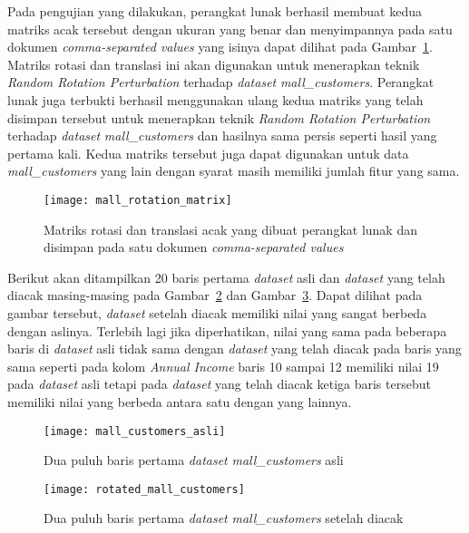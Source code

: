 Pada pengujian yang dilakukan, perangkat lunak berhasil membuat kedua matriks acak tersebut dengan ukuran yang benar dan menyimpannya pada satu dokumen \textit{comma-separated values} yang isinya dapat dilihat pada Gambar~\ref{fig:mall_rotation_matrix}. Matriks rotasi dan translasi ini akan digunakan untuk menerapkan teknik \textit{Random Rotation Perturbation} terhadap \textit{dataset} \textit{mall\_customers}. Perangkat lunak juga terbukti berhasil menggunakan ulang kedua matriks yang telah disimpan tersebut untuk menerapkan teknik \textit{Random Rotation Perturbation} terhadap \textit{dataset} \textit{mall\_customers} dan hasilnya sama persis seperti hasil yang pertama kali. Kedua matriks tersebut juga dapat digunakan untuk data \textit{mall\_customers} yang lain dengan syarat masih memiliki jumlah fitur yang sama.

\begin{figure}
	\centering
	\texttt{[image: mall\_rotation\_matrix]}
	\caption{Matriks rotasi dan translasi acak yang dibuat perangkat lunak dan disimpan pada satu dokumen  \textit{comma-separated values}}
	\label{fig:mall_rotation_matrix}
\end{figure}

Berikut akan ditampilkan 20 baris pertama \textit{dataset} asli dan \textit{dataset} yang telah diacak masing-masing pada Gambar~\ref{fig:mall_customers_asli} dan Gambar~\ref{fig:rotated_mall_customers}. Dapat dilihat pada gambar tersebut, \textit{dataset} setelah diacak memiliki nilai yang sangat berbeda dengan aslinya. Terlebih lagi jika diperhatikan, nilai yang sama pada beberapa baris di \textit{dataset} asli tidak sama dengan \textit{dataset} yang telah diacak pada baris yang sama seperti pada kolom \textit{Annual Income} baris 10 sampai 12 memiliki nilai 19 pada \textit{dataset} asli tetapi pada \textit{dataset} yang telah diacak ketiga baris tersebut memiliki nilai yang berbeda antara satu dengan yang lainnya.

\begin{figure}
	\centering
	\texttt{[image: mall\_customers\_asli]}
	\caption{Dua puluh baris pertama \textit{dataset} \textit{mall\_customers} asli}
	\label{fig:mall_customers_asli}
\end{figure}

\begin{figure}
	\centering
	\texttt{[image: rotated\_mall\_customers]}
	\caption{Dua puluh baris pertama \textit{dataset} \textit{mall\_customers} setelah diacak}
	\label{fig:rotated_mall_customers}
\end{figure}

